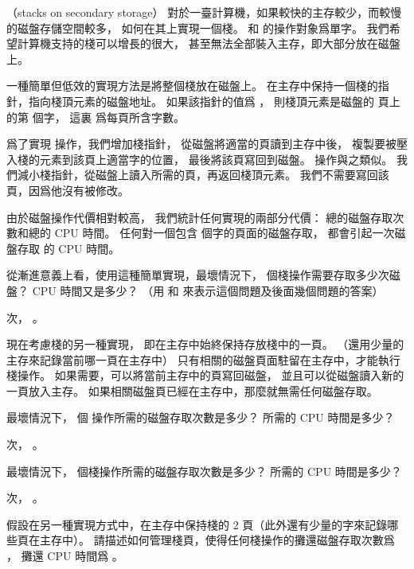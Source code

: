 \startsubject[
  title={Problems},
]

\startPROBLEM
（stacks on secondary storage）
對於一臺計算機，如果較快的主存較少，而較慢的磁盤存儲空間較多，
如何在其上實現一個棧。
  和  的操作對象爲單字。
我們希望計算機支持的棧可以增長的很大，
甚至無法全部裝入主存，即大部分放在磁盤上。

一種簡單但低效的實現方法是將整個棧放在磁盤上。
在主存中保持一個棧的指針，指向棧頂元素的磁盤地址。
如果該指針的值爲 ，
則棧頂元素是磁盤的  頁上的第  個字，
這裏  爲每頁所含字數。

爲了實現  操作，我們增加棧指針，
從磁盤將適當的頁讀到主存中後，
複製要被壓入棧的元素到該頁上適當字的位置，
最後將該頁寫回到磁盤。
  操作與之類似。
我們減小棧指針，從磁盤上讀入所需的頁，再返回棧頂元素。
我們不需要寫回該頁，因爲他沒有被修改。

由於磁盤操作代價相對較高，
我們統計任何實現的兩部分代價：
總的磁盤存取次數和總的 CPU 時間。
任何對一個包含  個字的頁面的磁盤存取，
都會引起一次磁盤存取  的 CPU 時間。

\startigBase[a]\startitem
從漸進意義上看，使用這種簡單實現，最壞情況下，  個棧操作需要存取多少次磁盤？
 CPU 時間又是多少？
（用  和  來表示這個問題及後面幾個問題的答案）
\stopitem\stopigBase

\startANSWER
{} 次， 。
\stopANSWER

現在考慮棧的另一種實現，
即在主存中始終保持存放棧中的一頁。
（還用少量的主存來記錄當前哪一頁在主存中）
只有相關的磁盤頁面駐留在主存中，才能執行棧操作。
如果需要，可以將當前主存中的頁寫回磁盤，
並且可以從磁盤讀入新的一頁放入主存。
如果相關磁盤頁已經在主存中，那麼就無需任何磁盤存取。

\startigBase[continue]\startitem
最壞情況下，  個  操作所需的磁盤存取次數是多少？
所需的 CPU 時間是多少？
\stopitem\stopigBase

\startANSWER
{} 次， 。
\stopANSWER

\startigBase[continue]\startitem
最壞情況下，  個棧操作所需的磁盤存取次數是多少？
所需的 CPU 時間是多少？
\stopitem\stopigBase

\startANSWER
{} 次， 。
\stopANSWER

假設在另一種實現方式中，在主存中保持棧的 2 頁（此外還有少量的字來記錄哪些頁在主存中）。
\startigBase[continue]\startitem
請描述如何管理棧頁，使得任何棧操作的攤還磁盤存取次數爲 ，
攤還 CPU 時間爲 。
\stopitem\stopigBase

